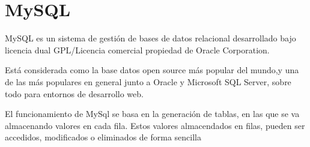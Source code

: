 \section{MySQL}
\label{mysql}
MySQL es un sistema de gestión de bases de datos relacional desarrollado bajo licencia dual GPL/Licencia comercial propiedad de Oracle Corporation.

Está considerada como la base datos open source más popular del mundo,y una de las más populares en general junto a Oracle y Microsoft SQL Server, sobre todo para entornos de desarrollo web.

El funcionamiento de MySql se basa en la generación de tablas, en las que se va almacenando valores en cada fila. Estos valores almacendados en filas, pueden ser accedidos, modificados o eliminados de forma sencilla